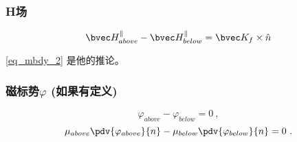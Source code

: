 \subsubsection{H场}
\begin{equation}
\bvec H^\parallel_{above} - \bvec H^\parallel_{below} = \bvec K_f \times \hat n 
\end{equation}

\autoref{eq_mbdy_2}  是他的推论。


\subsubsection{磁标势$\varphi$ (如果有定义)}
\begin{equation}
\varphi_{above}-\varphi_{below}=0~,
\end{equation}
\begin{equation}
\mu_{above}\pdv{\varphi_{above}}{n} - \mu_{below}\pdv{\varphi_{below}}{n}  = 0~.
\end{equation}
